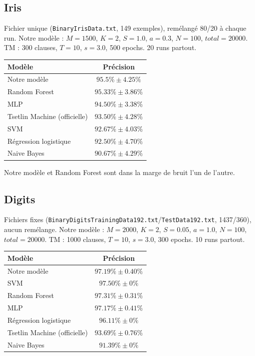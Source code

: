 \documentclass[12pt,a4paper]{article}
\begin{document}
\subsection*{Iris}
Fichier unique (\texttt{BinaryIrisData.txt}, 149 exemples), remélangé 80/20 à
chaque run. Notre modèle : $M{=}1500$, $K{=}2$, $S{=}1.0$, $a{=}0.3$,
$N{=}100$, $total{=}20000$. TM : 300 clauses, $T{=}10$, $s{=}3.0$, 500 epochs.
20 runs partout.
\begin{center}
\begin{tabular}{lc}
\toprule
Modèle & Précision \\
\midrule
Notre modèle & $\mathbf{95.5\%\pm4.25\%}$ \\
Random Forest & $95.33\%\pm3.86\%$ \\
MLP & $94.50\%\pm3.38\%$ \\
Tsetlin Machine (officielle) & $93.50\%\pm4.28\%$ \\
SVM & $92.67\%\pm4.03\%$ \\
Régression logistique & $92.50\%\pm4.70\%$ \\
Naive Bayes & $90.67\%\pm4.29\%$ \\
\bottomrule
\end{tabular}
\end{center}
Notre modèle et Random Forest sont dans la marge de bruit l'un de l'autre.

\subsection*{Digits}
Fichiers fixes (\texttt{BinaryDigitsTrainingData192.txt}/\texttt{TestData192.txt},
1437/360), aucun remélange. Notre modèle : $M{=}2000$, $K{=}2$, $S{=}0.05$,
$a{=}1.0$, $N{=}100$, $total{=}20000$. TM : 1000 clauses, $T{=}10$, $s{=}3.0$,
300 epochs. 10 runs partout.
\begin{center}
\begin{tabular}{lc}
\toprule
Modèle & Précision \\
\midrule
Notre modèle & $\mathbf{97.19\%\pm0.40\%}$ \\
SVM & $97.50\%\pm0\%$ \\
Random Forest & $97.31\%\pm0.31\%$ \\
MLP & $97.17\%\pm0.41\%$ \\
Régression logistique & $96.11\%\pm0\%$ \\
Tsetlin Machine (officielle) & $93.69\%\pm0.76\%$ \\
Naive Bayes & $91.39\%\pm0\%$ \\
\bottomrule
\end{tabular}
\end{center}
\end{document}
